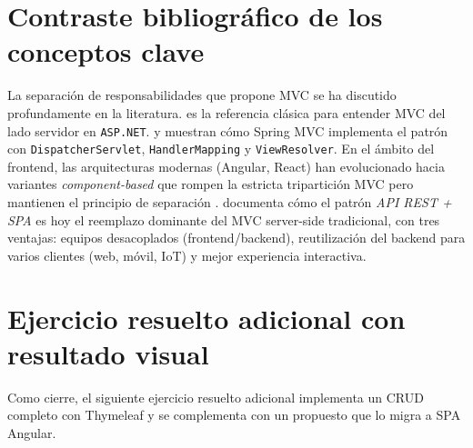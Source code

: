 \section{Contraste bibliográfico de los conceptos clave}

La separación de responsabilidades que propone MVC se ha discutido
profundamente en la literatura. \cite{galloway2011mvc} es la
referencia clásica para entender MVC del lado servidor en
\texttt{ASP.NET}. \cite{walls2022spring} y \cite{spilca2024spring}
muestran cómo Spring MVC implementa el patrón con
\texttt{DispatcherServlet}, \texttt{HandlerMapping} y
\texttt{ViewResolver}. En el ámbito del frontend, las arquitecturas
modernas (Angular, React) han evolucionado hacia variantes
\emph{component-based} que rompen la estricta tripartición MVC pero
mantienen el principio de separación
\cite{richards2020fundamentals}. \cite{richardson2007restful} documenta
cómo el patrón \emph{API REST + SPA} es hoy el reemplazo dominante
del MVC server-side tradicional, con tres ventajas: equipos
desacoplados (frontend/backend), reutilización del backend para
varios clientes (web, móvil, IoT) y mejor experiencia interactiva.

\section{Ejercicio resuelto adicional con resultado visual}

Como cierre, el siguiente ejercicio resuelto adicional
implementa un CRUD completo con Thymeleaf y se complementa con un
propuesto que lo migra a SPA Angular.



